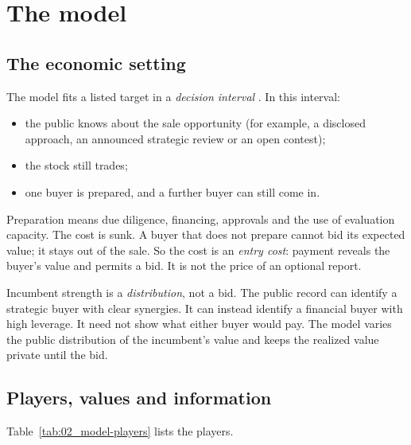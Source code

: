 \section{The model}\label{sec:02_model}

\subsection{The economic setting}\label{sec:02_model-setting}

The model fits a listed target in a \emph{decision interval} . In this interval:
\begin{itemize}
\item the public knows about the sale opportunity (for example, a disclosed approach, an announced
strategic review or an open contest);
\item the stock still trades;
\item one buyer is prepared, and a further buyer can still come in.
\end{itemize}
Preparation means due diligence, financing, approvals and the use of evaluation capacity. The cost is sunk.
A buyer that does not prepare cannot bid its expected value; it stays out of the sale. So the cost is an
\emph{entry cost}: payment reveals the buyer's value and permits a bid. It is not the price of an optional
report.

Incumbent strength is a \emph{distribution}, not a bid. The public record can identify a strategic buyer with clear synergies.
It can instead identify a financial buyer with high leverage. It
need not show what either buyer would pay. The model varies the public distribution of the incumbent's
value and keeps the realized value private until the bid.

\subsection{Players, values and information}\label{sec:02_model-players}

Table~\ref{tab:02_model-players} lists the players.

